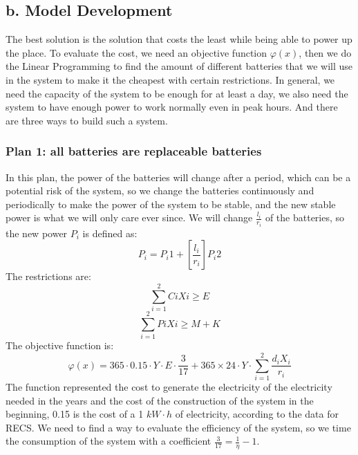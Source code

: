 \documentclass[UTF-8]{article}
\begin{document}
    \subsection{b. Model Development}
    The best solution is the solution that costs the least while being able to power up the place. To evaluate the cost, we need an objective function $\varphi (x)$, then we do the Linear Programming
    to find the amount of different batteries that we will use in the system to make it the cheapest with certain restrictions. In general, we need the  capacity of the system to be enough for
    at least a day, we also need the system to have enough power to work normally even in peak hours.
    And there are three ways to build such a system.
    \subsubsection{Plan 1: all batteries are replaceable batteries}
    In this plan, the power of the batteries will change after a period, which can be a potential risk of the system, so we change the batteries continuously and periodically to make
    the power of the system to be stable, and the new stable power is what we will only care ever since. We will change $\frac{l_i}{r_i}$ of the batteries, so the new power $P_i$ is  defined
    as:$$P_i=P_i1+[\frac{l_i}{r_i}]P_i2$$
    The restrictions are:
    $$\sum_{i=1}^2CiXi\geq E$$
    $$\sum_{i=1}^2PiXi\geq M+K$$
    The objective function is:
    $$\varphi (x)=365 \cdot 0.15 \cdot Y \cdot E \cdot \frac{3}{17} +365\times 24\cdot Y \cdot \sum_{i=1} ^2\frac{d_iX_i}{r_i}$$ 
    The function represented the cost to generate the electricity of the electricity needed in the years and the cost of the construction of the system in the beginning, 0.15 is the cost of a 1 $kW\cdot h$ of electricity, 
    according to the data for RECS. We need to find a way to evaluate the efficiency of the system, so we time the consumption of the system with a coefficient $\frac{3}{17}=\frac{1}{\eta }-1$.
\end{document}
